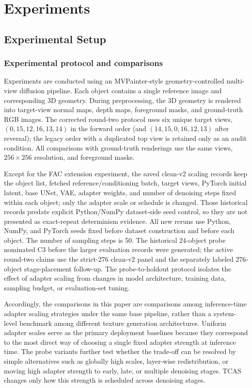 \documentclass[times,twocolumn,final]{elsarticle}
\begin{document}
\section{Experiments}
\label{sec:experiments}

\subsection{Experimental Setup}
\label{subsec:setup}

\subsubsection{Experimental protocol and comparisons}

Experiments are conducted using an MVPainter-style geometry-controlled multi-view diffusion pipeline. Each object contains a single reference image and corresponding 3D geometry. During preprocessing, the 3D geometry is rendered into target-view normal maps, depth maps, foreground masks, and ground-truth RGB images. The corrected round-two protocol uses six unique target views, $(0,15,12,16,13,14)$ in the forward order (and $(14,15,0,16,12,13)$ after reversal); the legacy order with a duplicated top view is retained only as an audit condition. All comparisons with ground-truth renderings use the same views, $256\times256$ resolution, and foreground masks.

Except for the FAC extension experiment, the saved clean-v2 scaling records keep the object list, fetched reference/conditioning batch, target views, PyTorch initial latent, base UNet, VAE, adapter weights, and number of denoising steps fixed within each object; only the adapter scale or schedule is changed. Those historical records predate explicit Python/NumPy dataset-side seed control, so they are not presented as exact-repeat determinism evidence. All new reruns use Python, NumPy, and PyTorch seeds fixed before dataset construction and before each object. The number of sampling steps is 50. The historical 24-object probe nominated C3 before the larger evaluation records were generated; the active round-two claims use the strict-276 clean-v2 panel and the separately labeled 276-object stage-placement follow-up. The probe-to-holdout protocol isolates the effect of adapter scaling from changes in model architecture, training data, sampling budget, or evaluation-set tuning.

Accordingly, the comparisons in this paper are comparisons among inference-time adapter scaling strategies under the same base pipeline, rather than a system-level benchmark among different texture generation architectures. Uniform adapter scales serve as the primary deployment baselines because they correspond to the most direct way of choosing a single fixed adapter strength at inference time. The probe variants further test whether the trade-off can be resolved by simple alternatives such as globally high scales, layer-wise redistribution, or moving high adapter strength to early, late, or multiple denoising stages. TCAS changes only how this strength is scheduled across denoising stages.
\end{document}
